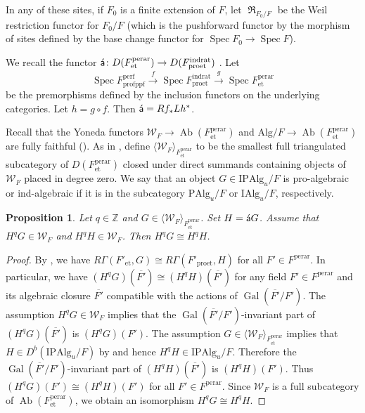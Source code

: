 \documentclass{amsart}
\newtheorem{Prop}[Thm]{Proposition}
\theoremstyle{remark}
\numberwithin{equation}{section}
\newcommand{\compose}{\mathbin{\circ}}
\newcommand{\closure}[1]{\overline{#1}}
\newcommand{\Z}{\mathbb{Z}}
\newcommand{\et}{\mathrm{et}}
\newcommand{\fppf}{\mathrm{fppf}}
\newcommand{\rat}{\mathrm{rat}}
\newcommand{\ind}{\mathrm{ind}}
\newcommand{\pro}{\mathrm{pro}}
\newcommand{\perf}{\mathrm{perf}}
\newcommand{\perar}{\mathrm{perar}}
\newcommand{\Alg}{\mathrm{Alg}}
\newcommand{\Ind}{\mathrm{I}}
\newcommand{\Pro}{\mathrm{P}}
\newcommand{\algebrize}{\Acute{\mathsf{a}}}
\newcommand{\genby}[1]{\langle #1 \rangle}
\DeclareMathOperator{\Gal}{Gal}
\DeclareMathOperator{\Spec}{Spec}
\DeclareMathOperator{\Ab}{Ab}
\DeclareMathOperator{\Weil}{\mathfrak{R}}
\begin{document}
In any of these sites, if $F_{0}$ is a finite extension of $F$,
let $\Weil_{F_{0} / F}$ be the Weil restriction functor for $F_{0} / F$
(which is the pushforward functor by the morphism of sites
defined by the base change functor for $\Spec F_{0} \to \Spec F$).

We recall the functor
$\algebrize \colon D(F^{\perar}_{\et}) \to D(F^{\ind\rat}_{\pro\et})$
\cite{Suz21Imp}.
Let
	\begin{equation} \label{0080}
			\Spec F^{\perf}_{\pro\fppf}
		\stackrel{f}{\to}
			\Spec F^{\ind\rat}_{\pro\et}
		\stackrel{g}{\to}
			\Spec F^{\perar}_{\et}
	\end{equation}
be the premorphisms defined by the inclusion functors on the underlying categories.
Let $h = g \compose f$.
Then $\algebrize = R f_{\ast} L h^{\ast}$.

Recall that the Yoneda functors
$\mathcal{W}_{F} \to \Ab(F^{\perar}_{\et})$
and $\Alg / F \to \Ab(F^{\perar}_{\et})$ are
fully faithful (\cite[Proposition 7.1]{Suz21Imp}).
As in \cite[Definition 3.1.3]{Suz24},
define $\genby{\mathcal{W}_{F}}_{F^{\perar}_{\et}}$
to be the smallest full triangulated subcategory of $D(F^{\perar}_{\et})$
closed under direct summands containing objects of $\mathcal{W}_{F}$ placed in degree zero.
We say that an object $G \in \Ind \Pro \Alg_{u} / F$ is pro-algebraic or ind-algebraic
if it is in the subcategory $\Pro \Alg_{u} / F$ or $\Ind \Alg_{u} / F$, respectively.

\begin{Prop} \label{0015}
	Let $q \in \Z$ and $G \in \genby{\mathcal{W}_{F}}_{F^{\perar}_{\et}}$.
	Set $H = \algebrize G$.
	Assume that $H^{q} G \in \mathcal{W}_{F}$ and $H^{q} H \in \mathcal{W}_{F}$.
	Then $H^{q} G \cong H^{q} H$.
\end{Prop}

\begin{proof}
	By \cite[Proposition 3.1.4]{Suz24},
	we have $R \Gamma(F'_{\et}, G) \cong R \Gamma(F'_{\pro\et}, H)$
	for all $F' \in F^{\perar}$.
	In particular, we have $(H^{q} G)(\closure{F'}) \cong (H^{q} H)(\closure{F'})$
	for any field $F' \in F^{\perar}$ and its algebraic closure $\closure{F'}$
	compatible with the actions of $\Gal(\closure{F'} / F')$.
	The assumption $H^{q} G \in \mathcal{W}_{F}$ implies that
	the $\Gal(\closure{F'} / F')$-invariant part of $(H^{q} G)(\closure{F'})$ is
	$(H^{q} G)(F')$.
	The assumption $G \in \genby{\mathcal{W}_{F}}_{F^{\perar}_{\et}}$ implies that
	$H \in D^{b}(\Ind \Pro \Alg_{u} / F)$ by \cite[Proposition 3.1.5]{Suz24}
	and hence $H^{q} H \in \Ind \Pro \Alg_{u} / F$.
	Therefore the $\Gal(\closure{F'} / F')$-invariant part of $(H^{q} H)(\closure{F'})$ is
	$(H^{q} H)(F')$.
	Thus $(H^{q} G)(F') \cong (H^{q} H)(F')$ for all $F' \in F^{\perar}$.
	Since $\mathcal{W}_{F}$ is a full subcategory of $\Ab(F^{\perar}_{\et})$,
	we obtain an isomorphism $H^{q} G \cong H^{q} H$.
\end{proof}
\end{document}
